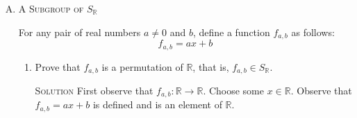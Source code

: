\documentclass[twoside]{amsart}
\newcommand{\Reals}{\ensuremath{\mathbb{R}}\xspace}
\newcommand{\Integers}{\mathbb{Z}{}}
\newcommand{\solution}{\textsc{Solution}\xspace}
\begin{document}
\begin{enumerate}[A.]
\begin{enumerate}[1]
      $G$ is closed with respect to $\circ$.
      \begin{proof}
      By part 2 we know that $f_n \circ f_m = f_{n+m}$ and $n+m \in \Integers$.
      \end{proof}

      $G$ is closed with respect to inverses.
      \begin{proof}
      By part 2 we know that $f_n^{-1} = f_{-n}$ and we know $-n \in \Integers$.
      \end{proof}

      We also know by part 1 that $f_n : \Reals \to \Reals$. Therefore 
      $G$ is a subgroup of $S_{\mathbb{R}}$.

      \vspace{5pt}
      \item Prove that $G$ is cyclic. (Indicate a generator of $G$.)
      
      \solution $G$ is $\langle f_1 \rangle$
      \begin{proof}
      We must show that for any element $m \in \Integers$ we can 
      generate $f_m$ from $f_1$. Let $m$ be greater than 0. Then we can
      generate $f_m$ by
      \[
         f_m = \underbrace{f_1 \circ f_1 \circ f_1 \cdots f_1 \circ f_1}_{
	          m \text{ factors}} 
      \]

      Next let $m$ be less than 0. Then we can generate it by
      \[
         f_m = \underbrace{f_{-1} \circ f_{-1} \cdots f_{-1}}_{
	          |m| \text{ factors}}
      \]

      Finally, let m = 0. Then $f_0 = f_1 \circ f_{-1} = \epsilon$.
      We have now shown how to generate all the elements in 
      $\{f_n : n \in Integers\}$ using $f_1$.
      \end{proof}


   \end{enumerate}

   \item \textsc{A Subgroup of} $S_\mathbb{R}$

   \noindent For any pair of real numbers $a \ne 0$ and $b$, define a function
   $f_{a,b}$ as follows:
   \[
      f_{a,b} = ax + b
   \]

   \begin{enumerate}[1]
      \item Prove that $f_{a,b}$ is a permutation of \Reals, that is,
      $f_{a,b} \in S_\mathbb{R}$.

      \solution First observe that $f_{a,b} : \Reals \to \Reals$. 
      Choose some $x \in \Reals$. Observe that $f_{a,b} = ax + b$
      is defined and is an element of \Reals. 


\end{enumerate}
\end{enumerate}
\end{document}
